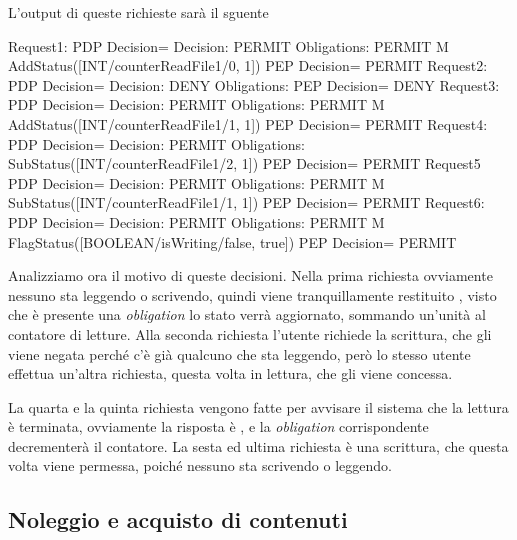 L'output di queste richieste sarà il sguente
\begin{verbnobox}[\small]
 Request1:
	  PDP Decision=
 	  Decision: PERMIT 
 	  Obligations: PERMIT M AddStatus([INT/counterReadFile1/0, 1])
	  PEP Decision= PERMIT
 Request2:
	  PDP Decision=
 	  Decision: DENY Obligations: 
	  PEP Decision= DENY
 Request3:
	  PDP Decision=
 	  Decision: PERMIT 
 	  Obligations: PERMIT M AddStatus([INT/counterReadFile1/1, 1])
	  PEP Decision= PERMIT
 Request4:
	  PDP Decision=
 	  Decision: PERMIT
 	  Obligations: SubStatus([INT/counterReadFile1/2, 1])
	  PEP Decision= PERMIT
 Request5
	  PDP Decision=
 	  Decision: PERMIT
 	  Obligations: PERMIT M SubStatus([INT/counterReadFile1/1, 1])
	  PEP Decision= PERMIT
 Request6:
	  PDP Decision=
 	  Decision: PERMIT 
 	  Obligations: PERMIT M FlagStatus([BOOLEAN/isWriting/false, true])
	  PEP Decision= PERMIT
 \end{verbnobox}
Analizziamo ora il motivo di queste decisioni. Nella prima richiesta ovviamente nessuno sta leggendo o scrivendo, quindi viene tranquillamente restituito \permit, visto che è presente una \textit{obligation} lo stato verrà aggiornato, sommando un'unità al contatore di letture.
Alla seconda richiesta l'utente richiede la scrittura, che gli viene negata perché c'è già qualcuno che sta leggendo, però lo stesso utente effettua un'altra richiesta, questa volta in lettura, che gli viene concessa.\\ \par
La quarta e la quinta richiesta vengono fatte per avvisare il sistema che la lettura è terminata, ovviamente la risposta è \permit, e la \textit{obligation} corrispondente decrementerà il contatore.
La sesta ed ultima richiesta è una scrittura, che questa volta viene permessa, poiché nessuno sta scrivendo o leggendo.



\subsection{Noleggio e acquisto di contenuti} %
\label{sub:secondo_esempio}

